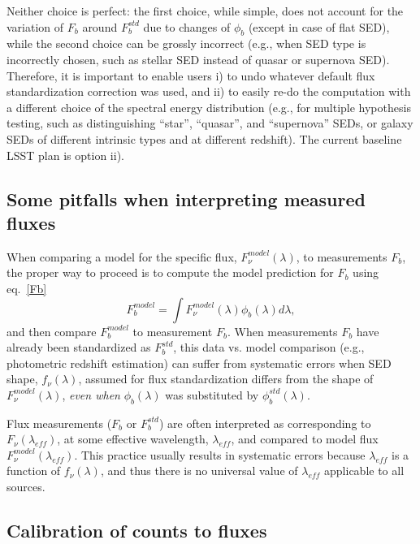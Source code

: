 \documentclass[PST,toc]{lsstdoc}
\begin{document}
Neither choice is perfect: the first choice, while simple, does not account for the variation of $F_b$ around
$F^{std}_b$ due to changes of $\phi_b$ (except in case of flat SED), while the second choice
can be grossly incorrect (e.g., when SED type is incorrectly chosen, such as stellar SED instead
of quasar or supernova SED). Therefore, it is important to enable users i) to undo whatever default
flux standardization correction was used, and ii) to easily re-do the computation with a different choice
of the spectral energy distribution (e.g., for multiple hypothesis testing, such as distinguishing
``star'', ``quasar'', and ``supernova'' SEDs, or galaxy SEDs of different intrinsic types and at
different redshift). The current baseline LSST plan is option ii).

\subsection{Some pitfalls when interpreting measured fluxes}

When comparing a model for the specific flux, $F_\nu^{model}(\lambda)$, to
measurements $F_b$, the proper way to proceed is to compute the model prediction
for $F_b$ using eq.~\ref{Fb}
\begin{equation}
\label{FbModel}
             F^{model}_b = \int{F_\nu^{model}(\lambda) \phi_b(\lambda) d\lambda},
\end{equation}
and then compare $F^{model}_b$ to measurement $F_b$.
When measurements $F_b$ have already been standardized as $F^{std}_b$,
this data vs. model comparison (e.g., photometric redshift estimation) can
suffer from systematic errors when SED shape, $f_\nu(\lambda)$,  assumed
for flux standardization differs from the shape of $F_\nu^{model}(\lambda)$,
\textit{even when} $\phi_b(\lambda)$ was substituted by $\phi^{std}_b(\lambda)$.

Flux measurements ($F_b$ or $F^{std}_b$) are often interpreted as corresponding to
$F_\nu(\lambda_{eff})$, at some effective wavelength, $\lambda_{eff}$, and compared
to model flux $F_\nu^{model}(\lambda_{eff})$. This practice usually results in systematic
errors because $\lambda_{eff}$ is a function of $f_\nu(\lambda)$, and thus there
is no universal value of $\lambda_{eff}$ applicable to all sources.


\subsection{Calibration of counts to fluxes}
\end{document}

